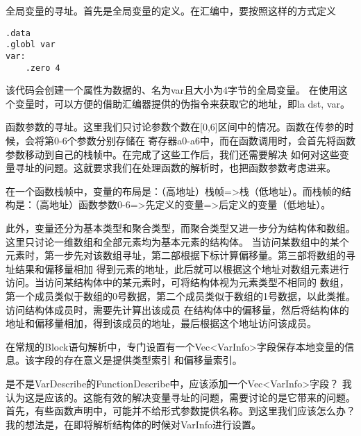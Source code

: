\documentclass[a4paper, oneside, twocolumn]{ctexbook}
\begin{document}
全局变量的寻址。首先是全局变量的定义。在汇编中，要按照这样的方式定义
\begin{lstlisting}
.data
.globl var
var:
    .zero 4
\end{lstlisting}
该代码会创建一个属性为数据的、名为var且大小为4字节的全局变量。
在使用这个变量时，可以方便的借助汇编器提供的伪指令来获取它的地址，即la dst, var。

函数参数的寻址。这里我们只讨论参数个数在[0,6]区间中的情况。函数在传参的时候，会将第0-6个参数分别存储在
寄存器a0-a6中，而在函数调用时，会首先将函数参数移动到自己的栈帧中。在完成了这些工作后，我们还需要解决
如何对这些变量寻址的问题。这就要求我们在处理函数的解析时，也把函数参数考虑进来。

在一个函数栈帧中，变量的布局是：（高地址）栈帧=>栈（低地址）。而栈帧的结构是：（高地址）函数参数0-6=>先定义的变量=>后定义的变量（低地址）。

此外，变量还分为基本类型和聚合类型，而聚合类型又进一步分为结构体和数组。这里只讨论一维数组和全部元素均为基本元素的结构体。
当访问某数组中的某个元素时，第一步先对该数组寻址，第二部根据下标计算偏移量。第三部将数组的寻址结果和偏移量相加
得到元素的地址，此后就可以根据这个地址对数组元素进行访问。当访问某结构体中的某元素时，可将结构体视为元素类型不相同的
数组，第一个成员类似于数组的0号数据，第二个成员类似于数组的1号数据，以此类推。访问结构体成员时，需要先计算出该成员
在结构体中的偏移量，然后将结构体的地址和偏移量相加，得到该成员的地址，最后根据这个地址访问该成员。

在常规的Block语句解析中，专门设置有一个Vec<VarInfo>字段保存本地变量的信息。该字段的存在意义是提供类型索引
和偏移量索引。

是不是VarDescribe的FunctionDescribe中，应该添加一个Vec<VarInfo>字段？
我认为这是应该的。这能有效的解决变量寻址的问题，需要讨论的是它带来的问题。
首先，有些函数声明中，可能并不给形式参数提供名称。到这里我们应该怎么办？
我的想法是，在即将解析结构体的时候对VarInfo进行设置。
\end{document}
